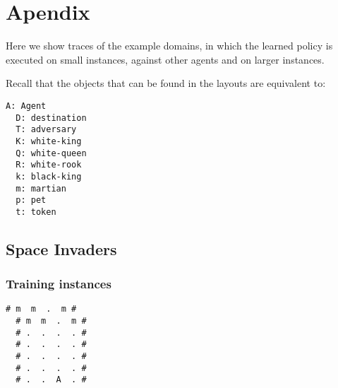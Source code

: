 \documentclass[a4paper]{article}
\begin{document}






\newpage



\section{Apendix}

Here we show traces of the example domains, in which the learned policy is executed on small instances, against other agents and on larger instances.

Recall that the objects that can be found in the layouts are equivalent to:
\begin{Verbatim}[fontsize=\footnotesize]
  A: Agent
  D: destination
  T: adversary
  K: white-king
  Q: white-queen
  R: white-rook
  k: black-king
  m: martian
  p: pet
  t: token
\end{Verbatim}

\subsection{Space Invaders}

\subsubsection{Training instances}
\begin{Verbatim}[fontsize=\footnotesize]
  # m  m  .  m #
  # m  m  .  m #
  # .  .  .  . #
  # .  .  .  . #
  # .  .  .  . #
  # .  .  .  . #
  # .  .  A  . #
\end{Verbatim}
\end{document}
